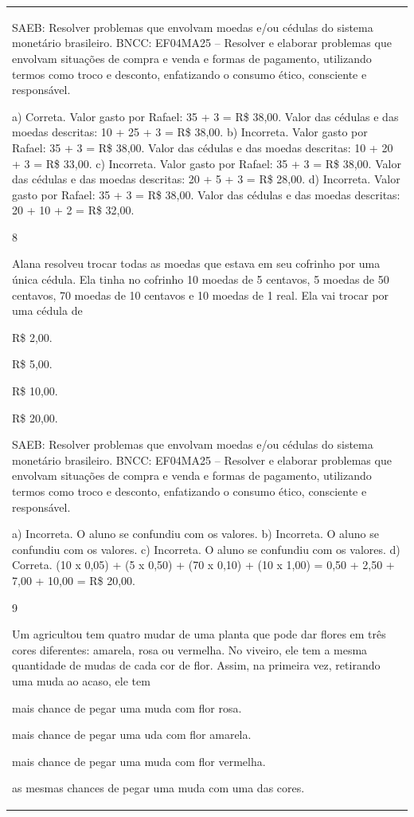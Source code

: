 \begin{mdframed}[linewidth=2pt,linecolor=salmao,roundcorner=2pt]
\begin{escolha}
{{{\begin{longtable}[]{@{}l@{}}
\begin{itemize}
{SAEB: Resolver problemas que envolvam moedas e/ou cédulas do
sistema monetário brasileiro.
BNCC: EF04MA25 -- Resolver e elaborar problemas que envolvam situações de compra e venda e formas
de pagamento, utilizando termos como troco e desconto, enfatizando o consumo ético, consciente e
responsável.

a) Correta. Valor gasto por Rafael: 35 + 3 = R\$ 38,00. Valor das cédulas e das moedas descritas: 10 + 25 + 3 = R\$ 38,00.
b) Incorreta. Valor gasto por Rafael: 35 + 3 = R\$ 38,00. Valor das cédulas e das moedas descritas: 10 + 20 + 3 = R\$ 33,00.
c) Incorreta. Valor gasto por Rafael: 35 + 3 = R\$ 38,00. Valor das cédulas e das moedas descritas: 20 + 5 + 3 = R\$ 28,00.
d) Incorreta. Valor gasto por Rafael: 35 + 3 = R\$ 38,00. Valor das cédulas e das moedas descritas: 20 + 10 + 2 = R\$ 32,00.

\num{8}

Alana resolveu trocar todas as moedas que estava em seu cofrinho por uma
única cédula. Ela tinha no cofrinho 10 moedas de 5 centavos, 5 moedas de
50 centavos, 70 moedas de 10 centavos e 10 moedas de 1 real. Ela vai trocar por uma cédula de

\begin{escolha}
\item R\$ 2,00.
\item R\$ 5,00.
\item R\$ 10,00.
\item R\$ 20,00.

SAEB: Resolver problemas que envolvam moedas e/ou cédulas do
sistema monetário brasileiro.
BNCC: EF04MA25 -- Resolver e elaborar problemas que envolvam situações de compra e venda e formas
de pagamento, utilizando termos como troco e desconto, enfatizando o consumo ético, consciente e
responsável.

a) Incorreta. O aluno se confundiu com os valores.
b) Incorreta. O aluno se confundiu com os valores.
c) Incorreta. O aluno se confundiu com os valores.
d) Correta. (10 x 0,05) + (5 x 0,50) + (70 x 0,10) + (10 x 1,00) = 0,50 + 2,50 + 7,00 + 10,00 = R\$ 20,00.

\num{9}

Um agricultou tem quatro mudar de uma planta que pode dar flores em três cores diferentes: amarela, rosa ou vermelha. No viveiro, ele tem a mesma quantidade de mudas de cada cor de flor. Assim, na primeira vez, retirando uma muda ao acaso, ele tem

\begin{escolha}
\item mais chance de pegar uma muda com flor rosa.
\item mais chance de pegar uma uda com flor amarela.
\item mais chance de pegar uma muda com flor vermelha.
\item as mesmas chances de pegar uma muda com uma das cores.
\end{escolha}


\end{escolha}}
\end{itemize}
\end{longtable}}}}
\end{escolha}
\end{mdframed}
